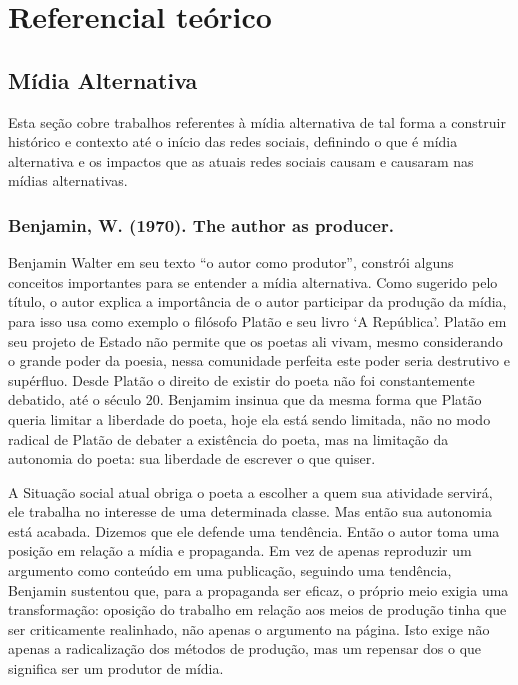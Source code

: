 
\chapter{Referencial teórico}

\section{Mídia Alternativa}
Esta seção cobre trabalhos referentes à mídia alternativa de tal forma a construir histórico e  contexto até o início das redes sociais, definindo o que é mídia alternativa  e os impactos que as atuais redes sociais causam e causaram nas mídias alternativas.
\subsection{Benjamin, W. (1970). The author as producer.}
Benjamin Walter em seu texto “o autor como produtor”, constrói alguns conceitos importantes para se entender a mídia alternativa. Como sugerido pelo título, o autor explica a importância de o autor participar da produção da mídia, para isso usa como exemplo o filósofo Platão e seu livro ‘A República’. Platão em seu projeto de Estado não permite que os poetas ali vivam, mesmo considerando o grande poder da poesia, nessa comunidade perfeita este poder seria destrutivo e supérfluo. Desde Platão o direito de existir do poeta não foi constantemente debatido, até o século 20. Benjamim insinua que da mesma forma que Platão queria limitar a liberdade do poeta, hoje ela está sendo limitada, não no modo radical de Platão de debater a existência do poeta, mas na limitação da autonomia do poeta: sua liberdade de escrever o que quiser.

A Situação social atual obriga o poeta a escolher a quem sua atividade servirá, ele trabalha no interesse de uma determinada classe. Mas então sua autonomia está acabada. Dizemos que ele defende uma tendência. Então o autor toma uma posição em relação a mídia e propaganda. Em vez de apenas reproduzir um argumento como conteúdo em uma publicação, seguindo uma tendência, Benjamin sustentou que, para a propaganda ser eficaz, o próprio meio exigia uma transformação: oposição do trabalho em relação aos meios de produção tinha que ser criticamente realinhado, não apenas o argumento na página. Isto exige não apenas a radicalização dos métodos de produção, mas um repensar dos o que significa ser um produtor de mídia.

